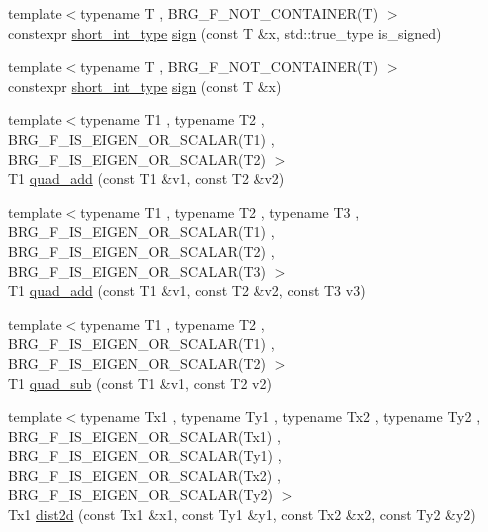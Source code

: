 \begin{DoxyCompactItemize}
\item 
{\footnotesize template$<$typename T , B\-R\-G\-\_\-\-F\-\_\-\-N\-O\-T\-\_\-\-C\-O\-N\-T\-A\-I\-N\-E\-R(\-T) $>$ }\\constexpr \hyperlink{lib_2IceBRG__main_2common_8h_a9a4c2c3afa89b73437fa1d63d607c7c1}{short\-\_\-int\-\_\-type} \hyperlink{namespaceIceBRG_a76091edf55c9e911511b09f5fe8fda81}{sign} (const T \&x, std\-::true\-\_\-type is\-\_\-signed)
\item 
{\footnotesize template$<$typename T , B\-R\-G\-\_\-\-F\-\_\-\-N\-O\-T\-\_\-\-C\-O\-N\-T\-A\-I\-N\-E\-R(\-T) $>$ }\\constexpr \hyperlink{lib_2IceBRG__main_2common_8h_a9a4c2c3afa89b73437fa1d63d607c7c1}{short\-\_\-int\-\_\-type} \hyperlink{namespaceIceBRG_a28283204e50f408fb1c5e6312981c1ab}{sign} (const T \&x)
\item 
{\footnotesize template$<$typename T1 , typename T2 , B\-R\-G\-\_\-\-F\-\_\-\-I\-S\-\_\-\-E\-I\-G\-E\-N\-\_\-\-O\-R\-\_\-\-S\-C\-A\-L\-A\-R(\-T1) , B\-R\-G\-\_\-\-F\-\_\-\-I\-S\-\_\-\-E\-I\-G\-E\-N\-\_\-\-O\-R\-\_\-\-S\-C\-A\-L\-A\-R(\-T2) $>$ }\\T1 \hyperlink{namespaceIceBRG_a2c4958952bda89f2403890a62c523d87}{quad\-\_\-add} (const T1 \&v1, const T2 \&v2)
\item 
{\footnotesize template$<$typename T1 , typename T2 , typename T3 , B\-R\-G\-\_\-\-F\-\_\-\-I\-S\-\_\-\-E\-I\-G\-E\-N\-\_\-\-O\-R\-\_\-\-S\-C\-A\-L\-A\-R(\-T1) , B\-R\-G\-\_\-\-F\-\_\-\-I\-S\-\_\-\-E\-I\-G\-E\-N\-\_\-\-O\-R\-\_\-\-S\-C\-A\-L\-A\-R(\-T2) , B\-R\-G\-\_\-\-F\-\_\-\-I\-S\-\_\-\-E\-I\-G\-E\-N\-\_\-\-O\-R\-\_\-\-S\-C\-A\-L\-A\-R(\-T3) $>$ }\\T1 \hyperlink{namespaceIceBRG_afa30f99c3dcd8fe6d6adaf6a79174cd2}{quad\-\_\-add} (const T1 \&v1, const T2 \&v2, const T3 v3)
\item 
{\footnotesize template$<$typename T1 , typename T2 , B\-R\-G\-\_\-\-F\-\_\-\-I\-S\-\_\-\-E\-I\-G\-E\-N\-\_\-\-O\-R\-\_\-\-S\-C\-A\-L\-A\-R(\-T1) , B\-R\-G\-\_\-\-F\-\_\-\-I\-S\-\_\-\-E\-I\-G\-E\-N\-\_\-\-O\-R\-\_\-\-S\-C\-A\-L\-A\-R(\-T2) $>$ }\\T1 \hyperlink{namespaceIceBRG_a0ed96352aa8c6745c1ddc132c774e437}{quad\-\_\-sub} (const T1 \&v1, const T2 v2)
\item 
{\footnotesize template$<$typename Tx1 , typename Ty1 , typename Tx2 , typename Ty2 , B\-R\-G\-\_\-\-F\-\_\-\-I\-S\-\_\-\-E\-I\-G\-E\-N\-\_\-\-O\-R\-\_\-\-S\-C\-A\-L\-A\-R(\-Tx1) , B\-R\-G\-\_\-\-F\-\_\-\-I\-S\-\_\-\-E\-I\-G\-E\-N\-\_\-\-O\-R\-\_\-\-S\-C\-A\-L\-A\-R(\-Ty1) , B\-R\-G\-\_\-\-F\-\_\-\-I\-S\-\_\-\-E\-I\-G\-E\-N\-\_\-\-O\-R\-\_\-\-S\-C\-A\-L\-A\-R(\-Tx2) , B\-R\-G\-\_\-\-F\-\_\-\-I\-S\-\_\-\-E\-I\-G\-E\-N\-\_\-\-O\-R\-\_\-\-S\-C\-A\-L\-A\-R(\-Ty2) $>$ }\\Tx1 \hyperlink{namespaceIceBRG_a1b4a86edf11877125aecd31b976282dc}{dist2d} (const Tx1 \&x1, const Ty1 \&y1, const Tx2 \&x2, const Ty2 \&y2)

\end{DoxyCompactItemize}
